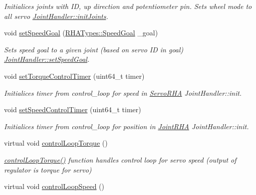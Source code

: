 \begin{DoxyCompactItemize}
\begin{DoxyCompactList}\small\item\em Initialices joints with ID, up direction and potentiometer pin. Sets wheel mode to all servo  \hyperlink{classJointHandler_a8a4fd8b876ad5118d27dbc668a003f28}{Joint\+Handler\+::init\+Joints}. \end{DoxyCompactList}\item 
void \hyperlink{classJointHandler_ad566695ecc649f08c799555976bb24bb}{set\+Speed\+Goal} (\hyperlink{structRHATypes_1_1SpeedGoal}{R\+H\+A\+Types\+::\+Speed\+Goal} \+\_\+goal)
\begin{DoxyCompactList}\small\item\em Sets speed goal to a given joint (based on servo ID in goal)  \hyperlink{classJointHandler_ad566695ecc649f08c799555976bb24bb}{Joint\+Handler\+::set\+Speed\+Goal}. \end{DoxyCompactList}\item 
void \hyperlink{classJointHandler_a6272112038118715e929fcf7e99085d1}{set\+Torque\+Control\+Timer} (uint64\+\_\+t timer)
\begin{DoxyCompactList}\small\item\em Initialices timer from control\+\_\+loop for speed in \hyperlink{classServoRHA}{Servo\+R\+HA}  Joint\+Handler\+::init. \end{DoxyCompactList}\item 
void \hyperlink{classJointHandler_aea4109237963e0ebf94beb842b08bfb6}{set\+Speed\+Control\+Timer} (uint64\+\_\+t timer)
\begin{DoxyCompactList}\small\item\em Initialices timer from control\+\_\+loop for position in \hyperlink{classJointRHA}{Joint\+R\+HA}  Joint\+Handler\+::init. \end{DoxyCompactList}\item 
virtual void \hyperlink{classJointHandler_a0edb0662d2f8f080d4d85f6a105eb6af}{control\+Loop\+Torque} ()\hypertarget{classJointHandler_a0edb0662d2f8f080d4d85f6a105eb6af}{}\label{classJointHandler_a0edb0662d2f8f080d4d85f6a105eb6af}

\begin{DoxyCompactList}\small\item\em \hyperlink{classJointHandler_a0edb0662d2f8f080d4d85f6a105eb6af}{control\+Loop\+Torque()} function handles control loop for servo speed (output of regulator is torque for servo) \end{DoxyCompactList}\item 
virtual void \hyperlink{classJointHandler_adc80ca17f1a1835f16c8045c82b0c06d}{control\+Loop\+Speed} ()\hypertarget{classJointHandler_adc80ca17f1a1835f16c8045c82b0c06d}{}\label{classJointHandler_adc80ca17f1a1835f16c8045c82b0c06d}


\end{DoxyCompactItemize}
